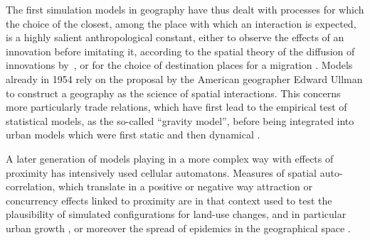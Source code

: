 \documentclass[10pt]{article}
\begin{document}
The first simulation models in geography have thus dealt with processes for which the choice of the closest, among the place with which an interaction is expected, is a highly salient anthropological constant, either to observe the effects of an innovation before imitating it, according to the spatial theory of the diffusion of innovations by~\cite{hagerstrand1957migration}, or for the choice of destination places for a migration \citep{hagerstrand1957migration,morrill1962development,morrill1963distribution}. Models already in 1954 rely on the proposal by the American geographer Edward Ullman to construct a geography as the science of spatial interactions. This concerns more particularly trade relations, which have first lead to the empirical test of statistical models, as the so-called ``gravity model'', before being integrated into urban models which were first static \citep{lowry1964model} and then dynamical \citep{clarke1983dynamics,wilson2014complex,allen1981urban,allen2012cities}.


A later generation of models playing in a more complex way with effects of proximity has intensively used cellular automatons. Measures of spatial auto-correlation, which translate in a positive or negative way attraction or concurrency effects linked to proximity are in that context used to test the plausibility of simulated configurations for land-use changes, and in particular urban growth \citep{white1993cellular,white2015modeling}, or moreover the spread of epidemics in the geographical space \citep{cliff2004world}.
\end{document}
